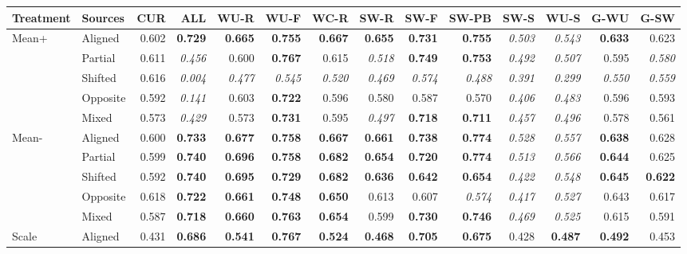 \begin{tabular}{@{}llrrrrrrrrrrrr@{}}
\toprule
Treatment & Sources & CUR & ALL & WU-R & WU-F & WC-R & SW-R & SW-F & SW-PB & SW-S & WU-S & G-WU & G-SW\\
\midrule
Mean+ & Aligned & 0.602 & \textbf{0.729} & \textbf{0.665} & \textbf{0.755} & \textbf{0.667} & \textbf{0.655} & \textbf{0.731} & \textbf{0.755} & \textit{0.503} & \textit{0.543} & \textbf{0.633} & 0.623\\
 & Partial & 0.611 & \textit{0.456} & 0.600 & \textbf{0.767} & 0.615 & \textit{0.518} & \textbf{0.749} & \textbf{0.753} & \textit{0.492} & \textit{0.507} & 0.595 & \textit{0.580}\\
 & Shifted & 0.616 & \textit{0.004} & \textit{0.477} & \textit{0.545} & \textit{0.520} & \textit{0.469} & \textit{0.574} & \textit{0.488} & \textit{0.391} & \textit{0.299} & \textit{0.550} & \textit{0.559}\\
 & Opposite & 0.592 & \textit{0.141} & 0.603 & \textbf{0.722} & 0.596 & 0.580 & 0.587 & 0.570 & \textit{0.406} & \textit{0.483} & 0.596 & 0.593\\
 & Mixed & 0.573 & \textit{0.429} & 0.573 & \textbf{0.731} & 0.595 & \textit{0.497} & \textbf{0.718} & \textbf{0.711} & \textit{0.457} & \textit{0.496} & 0.578 & 0.561\\
\addlinespace[2pt]
Mean- & Aligned & 0.600 & \textbf{0.733} & \textbf{0.677} & \textbf{0.758} & \textbf{0.667} & \textbf{0.661} & \textbf{0.738} & \textbf{0.774} & \textit{0.528} & \textit{0.557} & \textbf{0.638} & 0.628\\
 & Partial & 0.599 & \textbf{0.740} & \textbf{0.696} & \textbf{0.758} & \textbf{0.682} & \textbf{0.654} & \textbf{0.720} & \textbf{0.774} & \textit{0.513} & \textit{0.566} & \textbf{0.644} & 0.625\\
 & Shifted & 0.592 & \textbf{0.740} & \textbf{0.695} & \textbf{0.729} & \textbf{0.682} & \textbf{0.636} & \textbf{0.642} & \textbf{0.654} & \textit{0.422} & \textit{0.548} & \textbf{0.645} & \textbf{0.622}\\
 & Opposite & 0.618 & \textbf{0.722} & \textbf{0.661} & \textbf{0.748} & \textbf{0.650} & 0.613 & 0.607 & \textit{0.574} & \textit{0.417} & \textit{0.527} & 0.643 & 0.617\\
 & Mixed & 0.587 & \textbf{0.718} & \textbf{0.660} & \textbf{0.763} & \textbf{0.654} & 0.599 & \textbf{0.730} & \textbf{0.746} & \textit{0.469} & \textit{0.525} & 0.615 & 0.591\\
\addlinespace[2pt]
Scale & Aligned & 0.431 & \textbf{0.686} & \textbf{0.541} & \textbf{0.767} & \textbf{0.524} & \textbf{0.468} & \textbf{0.705} & \textbf{0.675} & 0.428 & \textbf{0.487} & \textbf{0.492} & 0.453\\

\end{tabular}

